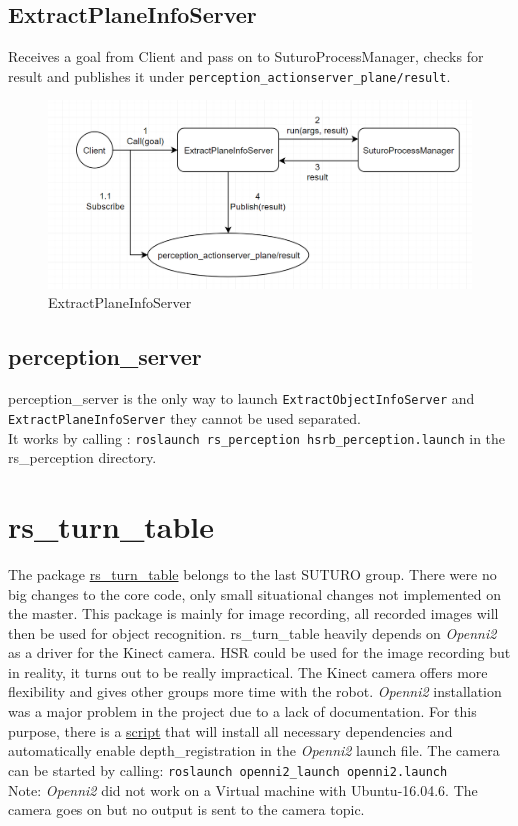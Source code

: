 \documentclass[main.tex]{subfiles}
\begin{document}
            \subsection{ExtractPlaneInfoServer}
Receives a goal from Client and pass on to SuturoProcessManager, checks for result and publishes it under \texttt{perception\_actionserver\_plane/result}.
            \begin{figure}[H]
                \centering
                 \includegraphics[width=1\textwidth]{pictures/perception/suturo_ExtractPlaneInfoServer.png}
                \caption{ExtractPlaneInfoServer}
              \end{figure}

            \subsection{perception\_server}
perception\_server is the only way to launch \texttt{ExtractObjectInfoServer} and \texttt{ExtractPlaneInfoServer} they cannot be used separated. \\
It works by calling : \texttt{roslaunch rs\_perception hsrb\_perception.launch} in the rs\_perception directory.

        \section{rs\_turn\_table}
The package \href{https://github.com/Vanessa-rin/rs_turn_table}{rs\_turn\_table} belongs to the last SUTURO group. There were no big changes to the core code, only small situational changes not implemented on the master. 
This package is mainly for image recording, all recorded images will then be used for object recognition.  
rs\_turn\_table heavily depends on \textit{Openni2} as a driver for the Kinect camera. HSR could be used for the image recording but in reality, it turns out to be really impractical. 
The Kinect camera offers more flexibility and gives other groups more time with the robot. \textit{Openni2} installation was a major problem in the project due to a lack of documentation. For this purpose, there is a 
\href{https://github.com/SUTURO/suturo_perception/blob/Openni2/Openni2/Openni2_Install}{script} that will install all necessary dependencies and automatically enable depth\_registration in the \textit{Openni2} launch file. The camera can be started by calling: \texttt{roslaunch openni2\_launch openni2.launch}
 \\ Note: \textit{Openni2} did not work on a Virtual machine with Ubuntu-16.04.6. The camera goes on but no output is sent to the camera topic. 
\end{document}
